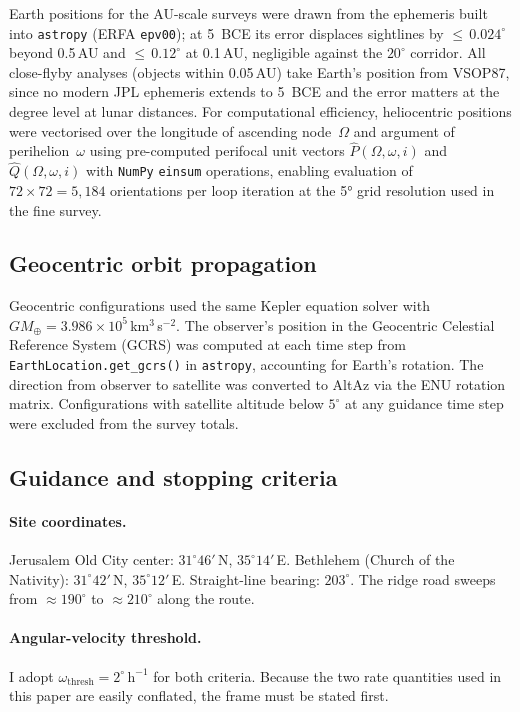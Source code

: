 \documentclass[11pt,a4paper]{article}
\begin{document}
Earth positions for the AU-scale surveys were drawn from the ephemeris built
into \texttt{astropy} (ERFA \texttt{epv00}); at 5~BCE its error displaces
sightlines by ${\leq}\,0.024^\circ$ beyond 0.5\,AU and ${\leq}\,0.12^\circ$ at
0.1\,AU, negligible against the $20^\circ$ corridor. All close-flyby analyses
(objects within 0.05\,AU) take Earth's position from VSOP87, since no modern
JPL ephemeris extends to 5~BCE and the error matters at the degree level at
lunar distances. For computational
efficiency, heliocentric positions were vectorised over the longitude of
ascending node~$\Omega$ and argument of perihelion~$\omega$ using
pre-computed perifocal unit vectors $\hat{P}(\Omega,\omega,i)$ and
$\hat{Q}(\Omega,\omega,i)$ with \texttt{NumPy} \texttt{einsum} operations,
enabling evaluation of $72\times72 = 5{,}184$ orientations per loop iteration
at the 5° grid resolution used in the fine survey.

\subsection{Geocentric orbit propagation}

Geocentric configurations used the same Kepler equation solver with
$GM_\oplus = 3.986\times10^5$\,km$^3$\,s$^{-2}$. The observer's position
in the Geocentric Celestial Reference System (GCRS) was computed at each
time step from \texttt{EarthLocation.get\_gcrs()} in \texttt{astropy},
accounting for Earth's rotation. The direction from observer to satellite
was converted to AltAz via the ENU rotation matrix. Configurations with
satellite altitude below $5^\circ$ at any guidance time step were excluded
from the survey totals.

\subsection{Guidance and stopping criteria}\label{subsec:criteria_si}

\paragraph{Site coordinates.}
Jerusalem Old City center: $31^\circ 46'$\,N, $35^\circ 14'$\,E.
Bethlehem (Church of the Nativity): $31^\circ 42'$\,N, $35^\circ 12'$\,E.
Straight-line bearing: $203^\circ$. The ridge road sweeps from
$\approx 190^\circ$ to $\approx 210^\circ$ along the route.

\paragraph{Angular-velocity threshold.}
I adopt $\omega_\mathrm{thresh} = 2^\circ\,\mathrm{h}^{-1}$ for both criteria.
Because the two rate quantities used in this paper are easily conflated, the
frame must be stated first.
\end{document}
